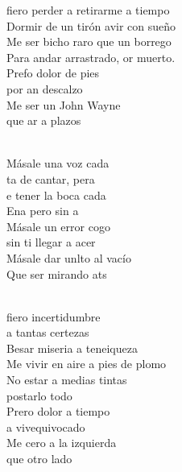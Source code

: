 \documentclass[12pt]{article}
\begin{document}
\begin{multicols*}{2}
\begin{cancion}%
	fiero perder a retirarme a tiempo\\
	Dormir de un tirón avir con sueño\\
	Me ser bicho raro que un borrego\\
	Para andar arrastrado, or muerto.\\
\jump
	Prefo dolor de pies\\
	por an descalzo\\
	Me ser un John Wayne \\
	que ar a plazos \\\jump\\
	\begin{chorus}%
	Másale una voz cada\\
	ta de cantar, pera\\
	e tener la boca cada\\
	Ena pero sin a\\
	Másale un error cogo\\
	 sin ti llegar a acer\\
	Másale dar unlto al vacío  \\
	Que ser mirando ats\\
	\end{chorus}%
	\jump\\
	fiero incertidumbre \\
a tantas certezas\\
	Besar miseria a teneiqueza\\
	Me vivir en aire a pies de plomo\\
No estar a medias tintas \\
	postarlo todo\\
\jump
	Prero dolor a tiempo \\
	a vivequivocado\\
	Me cero a la izquierda \\
	que otro lado\\\jump\\

\end{cancion}
\end{multicols*}
\end{document}
